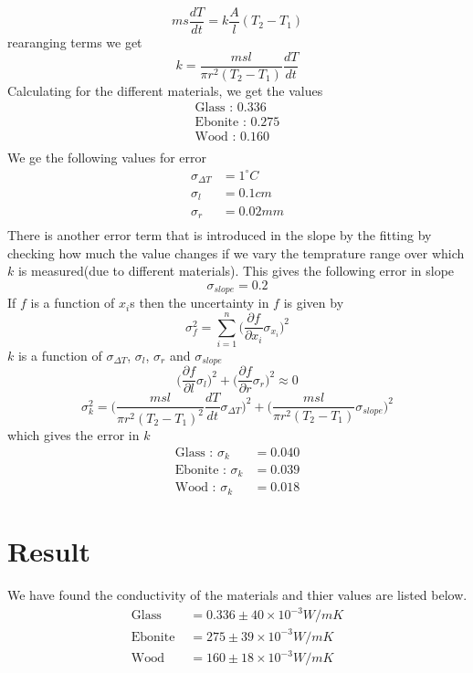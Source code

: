 \documentclass[12pt]{article}
\begin{document}
\[ms\frac{dT}{dt}=k\frac{A}{l}(T_2-T_1)\]
rearanging terms we get
\[k = \frac{msl}{\pi r^2(T_2-T_1)}\frac{dT}{dt}\]
Calculating for the different materials, we get the values
\begin{align*}
    \text{Glass : } 0.336\\
    \text{Ebonite : } 0.275\\
    \text{Wood : } 0.160\\
\end{align*}
We ge the following values for error
\begin{align*}
    \sigma_{\Delta T} &= 1^\circ C \\
    \sigma_l &= 0.1 cm \\
    \sigma_r &= 0.02 mm \\
\end{align*}
There is another error term that is introduced in the slope by the fitting by checking how much the value changes if we vary the temprature range over which $k$ is measured(due to different materials).
This gives the following error in slope
\[\sigma_{slope} = 0.2\]
If $f$ is a function of $x_i$s then the uncertainty in $f$ is given by
\[\sigma_f^2=\sum_{i = 1}^{n} \bigg(\frac{\partial f}{\partial x_i}\sigma_{x_i}\bigg)^2 \]
$k$ is a function of $\sigma_{\Delta T}$, $\sigma_l$, $\sigma_r$ and $\sigma_{slope}$
\[\bigg(\frac{\partial f}{\partial l}\sigma_{l}\bigg)^2+\bigg(\frac{\partial f}{\partial r}\sigma_{r}\bigg)^2 \approx 0\]
\[\sigma_k^2 =\bigg(\frac{msl}{\pi r^2(T_2-T_1)^2}\frac{dT}{dt}\sigma_{\Delta T}\bigg)^2 + \bigg(\frac{msl}{\pi r^2(T_2-T_1)}\sigma_{slope}\bigg)^2 \]
which gives the error in $k$
\begin{align*}
    \text{Glass : }\sigma_k &= 0.040 \\
    \text{Ebonite : }\sigma_k &= 0.039\\
    \text{Wood : }\sigma_k &= 0.018
\end{align*}
\section*{Result}
We have found the conductivity of the materials and thier values are listed below.
\begin{align*}
    \text{Glass } &= 0.336 \pm 40 \times 10^{-3} W/mK\\
    \text{Ebonite } &= 275 \pm 39\times 10^{-3} W/mK\\
    \text{Wood }&= 160 \pm  18\times 10^{-3} W/mK
\end{align*}
\end{document}
